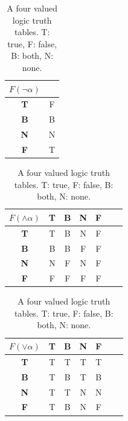 \documentclass{llncs}
\begin{document}
\begin{table}
    \caption{A four valued logic truth tables. T: true, F: false, B: both, N: none.\label{table:belnap}}
    \begin{minipage}{0.2\textwidth}
        \centering
        \begin{tabular}{|c||c|}\hline
            $F(\neg \alpha)$ & ~ \\ \hline \hline
            \textbf{T}       & F \\ \hline
            \textbf{B}       & B \\ \hline
            \textbf{N}       & N \\ \hline
            \textbf{F}       & T \\ \hline
        \end{tabular}
    \end{minipage}
    \begin{minipage}{0.35\textwidth}
        \centering
        \begin{tabular}{|c||c|c|c|c|c|c|}\hline
            $F(\land \alpha)$ & \textbf{T} & \textbf{B} & \textbf{N} & \textbf{F}  \\ \hline \hline
            \textbf{T}        & T          & B          & N          & F           \\ \hline
            \textbf{B}        & B          & B          & F          & F           \\ \hline
            \textbf{N}        & N          & F          & N          & F           \\ \hline
            \textbf{F}        & F          & F          & F          & F           \\ \hline
        \end{tabular}
    \end{minipage}
    \begin{minipage}{0.35\textwidth}
        \centering
        \begin{tabular}{|c||c|c|c|c|c|c|}\hline
            $F(\lor \alpha)$  & \textbf{T} & \textbf{B} & \textbf{N} & \textbf{F}  \\ \hline \hline
            \textbf{T}        & T          & T          & T          & T           \\ \hline
            \textbf{B}        & T          & B          & T          & B           \\ \hline
            \textbf{N}        & T          & T          & N          & N           \\ \hline
            \textbf{F}        & T          & B          & N          & F           \\ \hline
        \end{tabular}
    \end{minipage}
\end{table}
\end{document}
